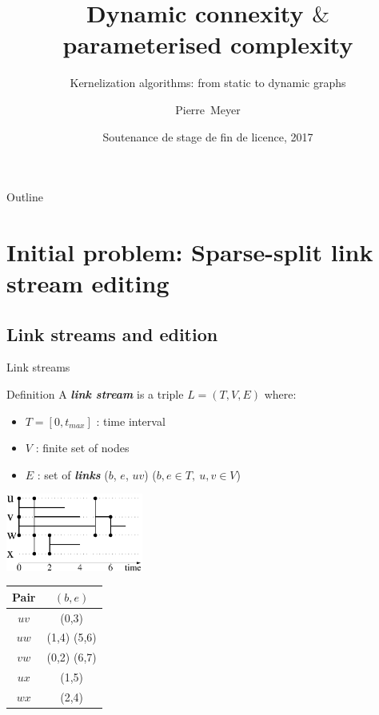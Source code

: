 \documentclass{beamer}
\title[Dynamic connexity $\&$ parameterised complexity]
{Dynamic connexity $\&$ parameterised complexity}
\subtitle
{Kernelization algorithms: from static to dynamic graphs}
\author[Meyer]
{Pierre~Meyer}
\institute[Universities of Somewhere and Elsewhere]
{
  Department of Computer Science\\
  Ecole Normale Superieure de Lyon}
\date[SL3 2017]
{Soutenance de stage de fin de licence, 2017}
\begin{document}
\begin{frame}
  \titlepage
\end{frame}

\begin{frame}{Outline}
  \tableofcontents
\end{frame}

\section{Initial problem: Sparse-split link stream editing}

\subsection{Link streams and edition}
\begin{frame}{Link streams}
  \begin{block}{Definition}
    A \emph{\bfseries link stream} is a triple $L=(T,V,E)$ where:
    \begin{itemize}
    \item $T=[0,t_{max}]$ : time interval
    \item $V$ : finite set of nodes
    \item $E$ : set of \emph{\bfseries links} ($b$, $e$, $uv$) ($b,e\in T,\ u,v\in V$)
    \end{itemize}
  \end{block}
  \begin{table}[!h]
    \begin{minipage}{0.4\linewidth}
      \centering
      \includegraphics[width=45mm]{exviard.pdf}
      \label{fig:exviard}
    \end{minipage}
    \begin{minipage}{0.4\linewidth}
      \centering
      \begin{tabular}{c c}
        \toprule
        Pair & $(b,e)$\\
        \midrule
        $uv$ & (0,3) \\
        $uw$ & (1,4) (5,6) \\
        $vw$ & (0,2) (6,7) \\
        $ux$ & (1,5) \\
        $wx$ & (2,4) \\
        \bottomrule
      \end{tabular}
    \end{minipage}
  \end{table}
\end{frame}
\end{document}
